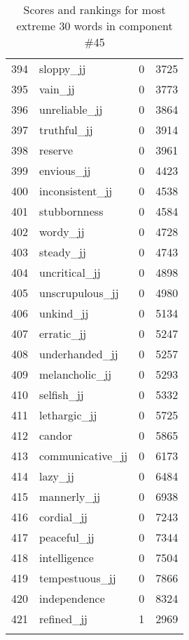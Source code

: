 \begin{longtable}[!htbp]{| rlr@{.}l |}
    394 & sloppy\_jj & 0 & 3725 \\
    395 & vain\_jj & 0 & 3773 \\
    396 & unreliable\_jj & 0 & 3864 \\
    397 & truthful\_jj & 0 & 3914 \\
    398 & reserve & 0 & 3961 \\
    399 & envious\_jj & 0 & 4423 \\
    400 & inconsistent\_jj & 0 & 4538 \\
    401 & stubbornness & 0 & 4584 \\
    402 & wordy\_jj & 0 & 4728 \\
    403 & steady\_jj & 0 & 4743 \\
    404 & uncritical\_jj & 0 & 4898 \\
    405 & unscrupulous\_jj & 0 & 4980 \\
    406 & unkind\_jj & 0 & 5134 \\
    407 & erratic\_jj & 0 & 5247 \\
    408 & underhanded\_jj & 0 & 5257 \\
    409 & melancholic\_jj & 0 & 5293 \\
    410 & selfish\_jj & 0 & 5332 \\
    411 & lethargic\_jj & 0 & 5725 \\
    412 & candor & 0 & 5865 \\
    413 & communicative\_jj & 0 & 6173 \\
    414 & lazy\_jj & 0 & 6484 \\
    415 & mannerly\_jj & 0 & 6938 \\
    416 & cordial\_jj & 0 & 7243 \\
    417 & peaceful\_jj & 0 & 7344 \\
    418 & intelligence & 0 & 7504 \\
    419 & tempestuous\_jj & 0 & 7866 \\
    420 & independence & 0 & 8324 \\
    421 & refined\_jj & 1 & 2969 \\
    \hline
    \caption{Scores and rankings for most extreme 30 words in component \#45} \\
\end{longtable}

